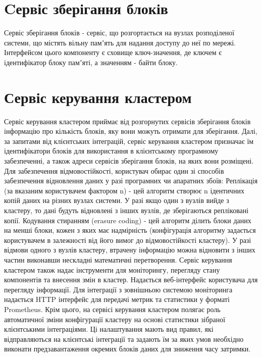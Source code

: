 \documentclass[14pt]{article}
\begin{document}
\section {Cервіс зберігання блоків}

Сервіс зберігання блоків - сервіс, що розгортається на вузлах розподіленої системи, що містять вільну памʼять для надання доступу до неї по мережі.
	Інтерфейсом цього компоненту є сховище ключ-значення, де ключем є ідентифікатор блоку памʼяті, а значенням - байти блоку.

\section {Сервіс керування кластером}

Сервіс керування кластером приймає від розгорнутих сервісів зберігання блоків інформацію про кількість блоків, яку вони можуть отримати для зберігання. Далі, за запитами від клієнтських інтеграцій, сервіс керування кластером призначає їм ідентифікатори блоків для використання в клієнтському програмному забезпеченні, а також адреси сервісів зберігання блоків, на яких вони розміщені.
	Для забезпечення відмовостійкості, користувач обирає один зі способів забезпечення відновлення даних у разі програмних чи апаратних збоїв:
Реплікація (за вказаним користувачем фактором n) - цей алгоритм створює n ідентичних копій даних на різних вузлах системи. У разі якщо один з вузлів вийде з кластеру, то дані будуть відновлені з інших вузлів, де зберігаються репліковані копії.
Кодування стиранням (erasure coding) - цей алгоритм ділить блоки даних на менші блоки, кожен з яких має надмірність (конфігурація алгоритму задається користувачем в залежності від його вимог до відмовостійкості кластеру). У разі відмови одного з вузлів кластеру, втрачену інформацію можна відновити з інших частин виконавши нескладні математичні перетворення.
Сервіс керування кластером також надає інструменти для моніторингу, перегляду стану компонентів та внесення змін в кластер. Надається веб-інтерфейс користувача для перегляду інформації. Для інтеграції з зовнішньою системою моніторинга надається HTTP інтерфейс для передачі метрик та статистики у форматі Prometheus.
Крім цього, на сервісі керування кластером полягає роль автоматичної зміни конфігурації кластеру на основі статистики зібраної клієнтськими інтеграціями. Ці налаштування мають вид правил, які відправляються на клієнтські інтеграції та задають їм за яких умов необхідно виконати предзавантаження окремих блоків даних для зниження часу затримки.
\end{document}
